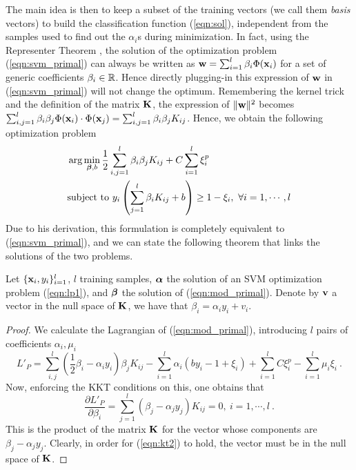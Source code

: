 The main idea is then to keep a subset of the training vectors (we call them
\emph{basis} vectors) to build the classification
function (\ref{eqn:sol}), independent from the samples used to find out the
$\alpha_i$s during minimization. In fact, using the Representer Theorem \cite{ScholkopfHS01},
the solution of the optimization problem (\ref{eqn:svm_primal}) can always be written as
$\ww = \sum_{i=1}^l \beta_i \Phi(\xx_i)$ for a set
of generic coefficients $\beta_i \in \RR$. Hence directly plugging-in this expression
of $\ww$ in (\ref{eqn:svm_primal}) will not change the optimum.
Remembering the kernel trick and the definition of the matrix $\KK$, the expression of $\|\ww\|^2$
becomes
$\sum_{i,j=1}^l \beta_i \beta_j \Phi(\xx_i) \cdot \Phi(\xx_j)=\sum_{i,j=1}^l \beta_i \beta_j K_{ij}$.
Hence, we obtain the following optimization problem 
%
\begin{align}
  \label{eqn:mod_primal}
  &\arg \min_{\bb,b} 
      \frac{1}{2} \sum_{i,j=1}^l \beta_i \beta_j K_{ij}
    + C \sum_{i=1}^l \xi_i^p \\
  &\text{subject to } y_i \left( \sum_{j=1}^l \beta_i K_{ij} + b \right) \geq 1-\xi_i, \ \forall i=1,\cdots,l \nonumber
\end{align}
%
Due to his derivation, this formulation is completely equivalent to
(\ref{eqn:svm_primal}), and we can state the following theorem that links the solutions
of the two problems.
%
\begin{teorema}
Let $\{\xx_i,y_i\}_{i=1}^l$, $l$ training samples, $\aa$ the solution of
an SVM optimization problem (\ref{eqn:lp1}), and $\bb$ the solution of (\ref{eqn:mod_primal}).
Denote by $\vv$ a vector in the null space of $\KK$, we have that
$\beta_i=\alpha_i y_i+ v_i$.
\end{teorema}
%
\begin{proof}
We calculate the Lagrangian of (\ref{eqn:mod_primal}), introducing $l$ pairs of
coefficients $\alpha_i, \mu_i$
%
\begin{equation} \label{eqn:svm_primal_general}
  L'_P = \sum_{i,j}^l \left( \frac{1}{2}\beta_i-\alpha_i y_i \right) \beta_j K_{ij}
         - \sum_{i=1}^l \alpha_i (b y_i -1 +\xi_i)
         + \sum_{i=1}^l C \xi_i^p - \sum_{i=1}^l \mu_i \xi_i~. \nonumber
\end{equation}
%
Now, enforcing the KKT conditions on this, one obtains that
%
\begin{equation} \label{eqn:kt2}
  \frac{\partial L'_P}{\partial \beta_i} = \sum_{j=1}^l (\beta_j - \alpha_j y_j) K_{ij} = 0,\ i=1,\cdots,l~.
\end{equation}
\noindent This is the product of the matrix $\KK$ for the vector whose components are
$\beta_j - \alpha_j y_j$. 
Clearly, in order for (\ref{eqn:kt2}) to hold, the vector must be in the null space of
$\KK$.
\end{proof}

